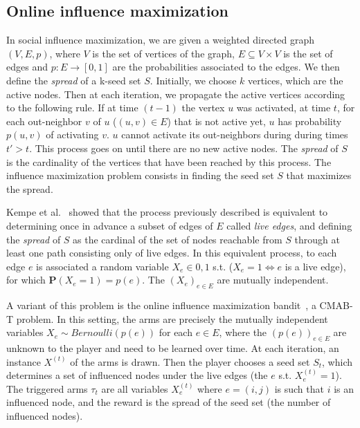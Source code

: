 \documentclass[a4paper,12pt]{article}
\begin{document}
\subsection{Online influence maximization}

In social influence maximization, we are given a weighted directed graph $(V, E, p)$, where $V$ is the set of vertices of the graph, $E\subseteq V\times V$ is the set of edges and $p:E\to [0, 1]$ are the probabilities associated to the edges. We then define the \emph{spread} of a k-seed set $S$. Initially, we choose $k$ vertices, which are the active nodes. Then at each iteration, we propagate the active vertices according to the following rule. If at time $(t-1)$ the vertex $u$ was activated, at time $t$, for each out-neighbor $v$ of $u$ ($(u, v)\in E$) that is not active yet, $u$ has probability $p(u, v)$ of activating $v$. $u$ cannot activate its out-neighbors during during times $t' > t$. This process goes on until there are no new active nodes. The \emph{spread} of $S$ is the cardinality of the vertices that have been reached by this process. The influence maximization problem consists in finding the seed set $S$ that maximizes the spread.

Kempe et al.~\cite{kempe2003maximizing} showed that the process previously described is equivalent to determining once in advance a subset of edges of $E$ called \emph{live edges}, and defining the \emph{spread} of $S$ as the cardinal of the set of nodes reachable from $S$ through at least one path consisting only of live edges. In this equivalent process, to each edge $e$ is associated a random variable $X_e \in {0, 1}$ s.t. ($X_e = 1 \iff e$ is a live edge), for which $\mathbf{P}(X_e = 1) = p(e)$. The $(X_e)_{e \in E}$ are mutually independent.

A variant of this problem is the online influence maximization bandit~\cite{chen2016combinatorial}, a CMAB-T problem. In this setting, the arms are precisely the mutually independent variables $X_e \sim Bernoulli(p(e))$ for each ${e \in E}$, where the $(p(e))_{e \in E}$ are unknown to the player and need to be learned over time. At each iteration, an instance $X^{(t)}$ of the arms is drawn. Then the player chooses a seed set $S_t$, which determines a set of influenced nodes under the live edges (the $e$ s.t. $X_{e}^{(t)} = 1$). The triggered arms $\tau_t$ are all variables $X_e^{(t)}$ where $e = (i, j)$ is such that $i$ is an influenced node, and the reward is the spread of the seed set (the number of influenced nodes).
\end{document}
